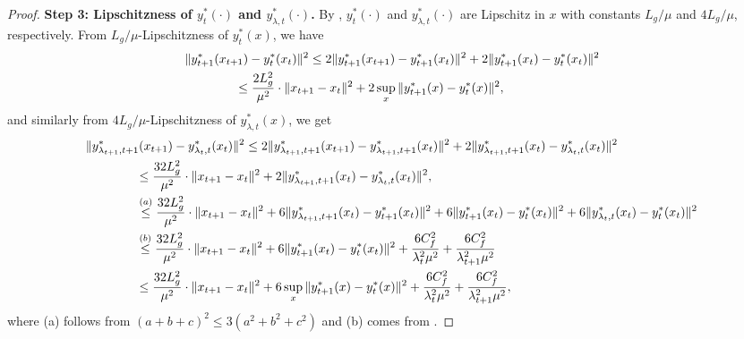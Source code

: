 \documentclass{uai2026} %
\begin{document}
\begin{proof}
\textbf{Step 3: Lipschitzness of $y^{*}_{t}(\cdot)$ and $y^{*}_{\lambda,t}(\cdot)$.}
By , $y^{*}_t(\cdot)$ and $y^{*}_{\lambda,t}(\cdot)$
are Lipschitz in $x$ with constants $L_g/\mu$ and $4L_g/\mu$, respectively. From $L_{g}/\mu$-Lipschitzness of $y^{*}_{t}(x)$, we have
\begin{align}
    \MoveEqLeft[4]\|y^{*}_{t+1}(x_{t+1})-y^{*}_{t}(x_{t})\|^{2}\le 2\|y^{*}_{t+1}(x_{t+1})-y^{*}_{t+1}(x_{t})\|^{2}+2\|y^{*}_{t+1}(x_{t})-y^{*}_{t}(x_{t})\|^{2}\nonumber\\
    &\le \frac{2L^{2}_{g}}{\mu^{2}}\cdot\|x_{t+1}-x_{t}\|^{2}+2\sup_{x}\|y^{*}_{t+1}(x)-y^{*}_{t}(x)\|^{2},\label{eq_0022_2}
\end{align}
and similarly from $4L_{g}/\mu$-Lipschitzness of $y^{*}_{\lambda,t}(x)$, we get
\begin{align}
    \MoveEqLeft[4]\|y^{*}_{\lambda_{t+1},t+1}(x_{t+1})-y^{*}_{\lambda_{t},t}(x_{t})\|^{2}\le 2\|y^{*}_{\lambda_{t+1},t+1}(x_{t+1})-y^{*}_{\lambda_{t+1},t+1}(x_{t})\|^{2}+2\|y^{*}_{\lambda_{t+1},t+1}(x_{t})-y^{*}_{\lambda_{t},t}(x_{t})\|^{2}\nonumber\\
    &\le \frac{32L^{2}_{g}}{\mu^{2}}\cdot\|x_{t+1}-x_{t}\|^{2}+2\|y^{*}_{\lambda_{t+1},t+1}(x_{t})-y^{*}_{\lambda_{t},t}(x_{t})\|^{2},\nonumber\\
    &\overset{(a)}{\le} \frac{32L^{2}_{g}}{\mu^{2}}\cdot\|x_{t+1}-x_{t}\|^{2}+6\|y^{*}_{\lambda_{t+1},t+1}(x_{t})-y^{*}_{t+1}(x_{t})\|^{2}+6\|y^{*}_{t+1}(x_{t})-y^{*}_{t}(x_{t})\|^{2}+6\|y^{*}_{\lambda_{t},t}(x_{t})-y^{*}_{t}(x_{t})\|^{2}\nonumber\\
    &\overset{(b)}{\le} \frac{32L^{2}_{g}}{\mu^{2}}\cdot\|x_{t+1}-x_{t}\|^{2}+6\|y^{*}_{t+1}(x_{t})-y^{*}_{t}(x_{t})\|^{2}+\frac{6C_{f}^{2}}{\lambda_{t}^{2}\mu^{2}}+\frac{6C_{f}^{2}}{\lambda_{t+1}^{2}\mu^{2}}\nonumber\\
    &\le \frac{32L^{2}_{g}}{\mu^{2}}\cdot\|x_{t+1}-x_{t}\|^{2}+6\sup_{x}\|y^{*}_{t+1}(x)-y^{*}_{t}(x)\|^{2}+\frac{6C_{f}^{2}}{\lambda_{t}^{2}\mu^{2}}+\frac{6C_{f}^{2}}{\lambda_{t+1}^{2}\mu^{2}},\label{eq_00023}
\end{align}
where (a) follows from $(a+b+c)^2\le 3(a^2+b^2+c^2)$ and (b) comes from .




\end{proof}
\end{document}
